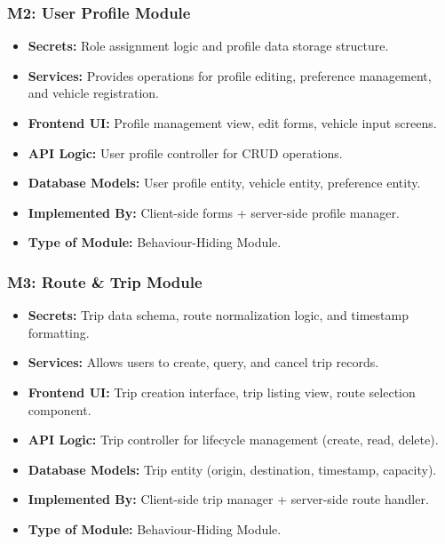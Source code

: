 \subsubsection*{M2: User Profile Module}
\begin{itemize}
  \item \textbf{Secrets:} Role assignment logic and profile data storage structure.
  \item \textbf{Services:} Provides operations for profile editing, preference management, and vehicle registration.
  \item \textbf{Frontend UI:} Profile management view, edit forms, vehicle input screens.
  \item \textbf{API Logic:} User profile controller for CRUD operations.
  \item \textbf{Database Models:} User profile entity, vehicle entity, preference entity.
  \item \textbf{Implemented By:} Client-side forms + server-side profile manager.
  \item \textbf{Type of Module:} Behaviour-Hiding Module.
\end{itemize}

\subsubsection*{M3: Route \& Trip Module}
\begin{itemize}
  \item \textbf{Secrets:} Trip data schema, route normalization logic, and timestamp formatting.
  \item \textbf{Services:} Allows users to create, query, and cancel trip records.
  \item \textbf{Frontend UI:} Trip creation interface, trip listing view, route selection component.
  \item \textbf{API Logic:} Trip controller for lifecycle management (create, read, delete).
  \item \textbf{Database Models:} Trip entity (origin, destination, timestamp, capacity).
  \item \textbf{Implemented By:} Client-side trip manager + server-side route handler.
  \item \textbf{Type of Module:} Behaviour-Hiding Module.
\end{itemize}

